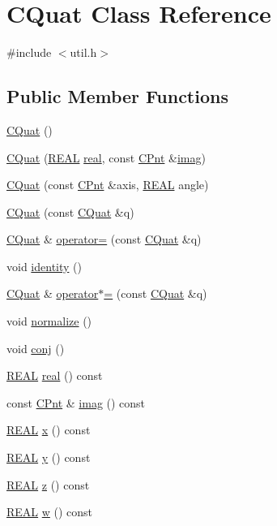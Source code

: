 \hypertarget{classCQuat}{\section{C\-Quat Class Reference}
\label{classCQuat}
}


{\ttfamily \#include $<$util.\-h$>$}

\subsection*{Public Member Functions}
\begin{DoxyCompactItemize}
\item 
\hyperlink{classCQuat_aa8497e624cd8c83814ee708beed80be8}{C\-Quat} ()
\item 
\hyperlink{classCQuat_a9e2eb21a9c7ec78d94e0fe38e34b242b}{C\-Quat} (\hyperlink{util_8h_a5821460e95a0800cf9f24c38915cbbde}{R\-E\-A\-L} \hyperlink{classCQuat_a7f18efa604d788a39bb6726de6546ce2}{real}, const \hyperlink{classCPnt}{C\-Pnt} \&\hyperlink{classCQuat_a783b34fbc307fbb00fd112c8441b0f30}{imag})
\item 
\hyperlink{classCQuat_a5225432b6d2298207cadd596073a500c}{C\-Quat} (const \hyperlink{classCPnt}{C\-Pnt} \&axis, \hyperlink{util_8h_a5821460e95a0800cf9f24c38915cbbde}{R\-E\-A\-L} angle)
\item 
\hyperlink{classCQuat_acd11b75e7090f6a6992425bcc5416219}{C\-Quat} (const \hyperlink{classCQuat}{C\-Quat} \&q)
\item 
\hyperlink{classCQuat}{C\-Quat} \& \hyperlink{classCQuat_ad7a24172721a059adcbf40f6db7584fb}{operator=} (const \hyperlink{classCQuat}{C\-Quat} \&q)
\item 
void \hyperlink{classCQuat_a9a0a307a7660ba46e1587b67f5cc35ea}{identity} ()
\item 
\hyperlink{classCQuat}{C\-Quat} \& \hyperlink{classCQuat_a91a9f75dd706a025a68121522d30a561}{operator$\ast$=} (const \hyperlink{classCQuat}{C\-Quat} \&q)
\item 
void \hyperlink{classCQuat_ab6e67daab741dfb157e3e5562a804706}{normalize} ()
\item 
void \hyperlink{classCQuat_a03c7815f439647be9e4cc8f3937cd0d0}{conj} ()
\item 
\hyperlink{util_8h_a5821460e95a0800cf9f24c38915cbbde}{R\-E\-A\-L} \hyperlink{classCQuat_a7f18efa604d788a39bb6726de6546ce2}{real} () const 
\item 
const \hyperlink{classCPnt}{C\-Pnt} \& \hyperlink{classCQuat_a783b34fbc307fbb00fd112c8441b0f30}{imag} () const 
\item 
\hyperlink{util_8h_a5821460e95a0800cf9f24c38915cbbde}{R\-E\-A\-L} \hyperlink{classCQuat_ae6b5a06a27a9253ec3737101ddd02ee5}{x} () const 
\item 
\hyperlink{util_8h_a5821460e95a0800cf9f24c38915cbbde}{R\-E\-A\-L} \hyperlink{classCQuat_a01fcb600b793533c9f7554668739ac86}{y} () const 
\item 
\hyperlink{util_8h_a5821460e95a0800cf9f24c38915cbbde}{R\-E\-A\-L} \hyperlink{classCQuat_a1d2b9113413336187282a0dffcf5b39b}{z} () const 
\item 
\hyperlink{util_8h_a5821460e95a0800cf9f24c38915cbbde}{R\-E\-A\-L} \hyperlink{classCQuat_a8e83cf929e0e4f669482b419b20a096c}{w} () const 
\end{DoxyCompactItemize}
